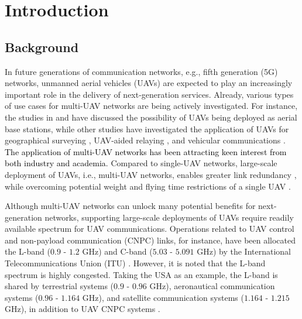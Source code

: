 \chapter{Introduction}
\label{chap:introduction}

\section{Background}
In future generations of communication networks, e.g., fifth generation (5G) networks, unmanned aerial vehicles (UAVs) are expected to play an increasingly important role in the delivery of next-generation services. Already, various types of use cases for multi-UAV networks are being actively investigated. For instance, the studies in \cite{yadav2018full} and \cite{mozaffari2017wireless} have discussed the possibility of UAVs being deployed as aerial base stations, while other studies have investigated the application of UAVs for geographical surveying \cite{andre2014application}, UAV-aided relaying \cite{azari2018ultra}, and vehicular communications \cite{xiao2018uav,xiao2018user}. \textcolor{black}{The application of multi-UAV networks has been attracting keen interest from both industry and academia}. Compared to single-UAV networks, large-scale deployment of UAVs, i.e., multi-UAV networks, enables greater link redundancy \cite{wang2017taking}, while overcoming potential weight and flying time restrictions of a single UAV \cite{andre2014application}.


Although multi-UAV networks can unlock many potential benefits for next-generation networks, supporting large-scale deployments of UAVs require readily available spectrum for UAV communications. Operations related to UAV control and non-payload communication (CNPC) links, for instance, have been allocated the L-band ($0.9$ - $1.2$ GHz) and C-band ($5.03$ - $5.091$ GHz) by the International Telecommunications Union (ITU) \cite{matolak2017air_suburban}. However, it is noted that the L-band spectrum is highly congested. Taking the USA as an example, the L-band is shared by terrestrial systems ($0.9$ - $0.96$ GHz), aeronautical communication systems ($0.96$ - $1.164$ GHz), and satellite communication systems ($1.164$ - $1.215$ GHz), in addition to UAV CNPC systems \cite{fcc2019online}.

